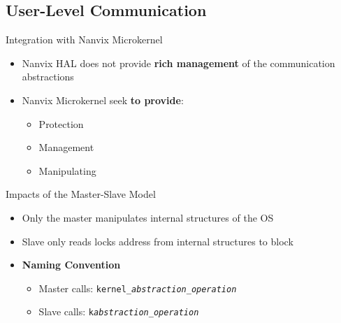	\subsection{User-Level Communication}

		\begin{frame}[fragile]{Integration with Nanvix Microkernel}
			\begin{itemize}
				\item Nanvix HAL does not provide \textbf{rich management} of the communication abstractions
				\item Nanvix Microkernel seek \textbf{to provide}:
				\begin{itemize}
					\item Protection
					\item Management
					\item Manipulating
				\end{itemize}
			\end{itemize}

		\end{frame}

		\begin{frame}[fragile]{Impacts of the Master-Slave Model}
			\begin{itemize}
				\item Only the master manipulates internal structures of the OS
				\item Slave only reads locks address from internal structures to block
				\item \textbf{Naming Convention}
				\begin{itemize}
					\item Master calls: \texttt{kernel\_\textit{abstraction}\_\textit{operation}}
					\item Slave calls: \texttt{k\textit{abstraction}\_\textit{operation}}
				\end{itemize}
			\end{itemize}

		\end{frame}

